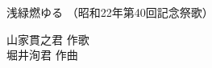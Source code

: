 \documentclass[10pt,b5j]{tarticle} %
\begin{document}
\begin{minipage}[c]{0.7\hsize} %
    \begin{center}
        {\LARGE
            浅緑燃ゆる %
        }
        {\small 
            （昭和22年第40回記念祭歌） %
        }
    \end{center}
\end{minipage}
\begin{minipage}[c]{0.3\hsize} %
    \begin{flushright} %
        山家貫之君 作歌\\堀井洵君 作曲 %
    \end{flushright}
\end{minipage}
\end{document}
